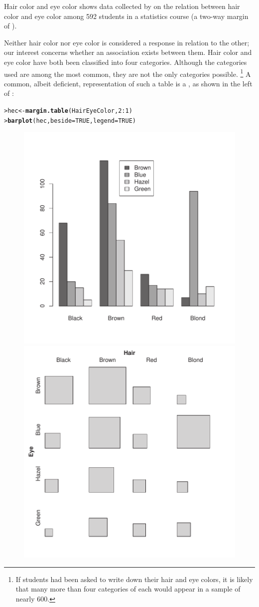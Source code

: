 \documentclass[10pt,krantz2]{krantz}\usepackage[]{graphicx}\usepackage[]{color}
\makeatletter
\newcommand{\hlnum}[1]{\textcolor[rgb]{0.686,0.059,0.569}{#1}}%
\newcommand{\hlopt}[1]{\textcolor[rgb]{0,0,0}{#1}}%
\newcommand{\hlstd}[1]{\textcolor[rgb]{0.345,0.345,0.345}{#1}}%
\newcommand{\hlkwb}[1]{\textcolor[rgb]{0.69,0.353,0.396}{#1}}%
\newcommand{\hlkwc}[1]{\textcolor[rgb]{0.333,0.667,0.333}{#1}}%
\newcommand{\hlkwd}[1]{\textcolor[rgb]{0.737,0.353,0.396}{\textbf{#1}}}%
\newenvironment{kframe}{%
 \def\at@end@of@kframe{}%
 \ifinner\ifhmode%
  \def\at@end@of@kframe{\end{minipage}}%
  \begin{minipage}{\columnwidth}%
 \fi\fi%
 \def\FrameCommand##1{\hskip\@totalleftmargin \hskip-\fboxsep
 \colorbox{shadecolor}{##1}\hskip-\fboxsep
     \hskip-\linewidth \hskip-\@totalleftmargin \hskip\columnwidth}%
 \MakeFramed {\advance\hsize-\width
   \@totalleftmargin\z@ \linewidth\hsize
   \@setminipage}}%
 {\par\unskip\endMakeFramed%
 \at@end@of@kframe}
\newenvironment{knitrout}{}{} %
\renewenvironment{knitrout}{\small\renewcommand{\baselinestretch}{.85}}{} %
\makeatother
\begin{document}
\begin{Example}[haireye1]{Hair color and eye color}
 shows data collected by
\citet{Snee:74}
on the relation between hair color and eye color among 592
students in a statistics course
(a two-way margin of ).

Neither hair color nor eye color
is considered a response in relation to the other;  our interest concerns
whether an association exists between them.
Hair color and eye color have both been classified
into four categories.  Although the categories used are among the most
common, they are not the only categories possible.%
\footnote{If students had been asked to write down their hair and eye
colors, it is likely that many more than four categories of each
would appear in a sample of nearly 600.}
A common, albeit deficient, representation of such a table is a
, as shown in the left of : 
\begin{knitrout}
\color{fgcolor}\begin{kframe}
\begin{alltt}
\hlstd{> }\hlstd{hec} \hlkwb{<-} \hlkwd{margin.table}\hlstd{(HairEyeColor,} \hlnum{2}\hlopt{:}\hlnum{1}\hlstd{)}
\hlstd{> }\hlkwd{barplot}\hlstd{(hec,} \hlkwc{beside} \hlstd{=} \hlnum{TRUE}\hlstd{,} \hlkwc{legend} \hlstd{=} \hlnum{TRUE}\hlstd{)}
\end{alltt}
\end{kframe}
\end{knitrout}
\begin{knitrout}
\color{fgcolor}\begin{figure}[!htbp]

\centerline{\includegraphics[width=.49\textwidth]{ch04/fig/bartile-1} 
\includegraphics[width=.49\textwidth]{ch04/fig/bartile-2} }


\end{figure}
\end{knitrout}
\end{Example}
\end{document}
